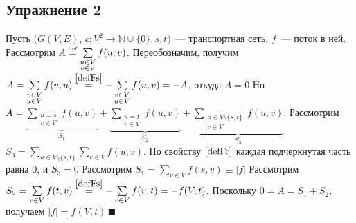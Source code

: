 \documentclass[a4paper]{article}
\def\eqdef{\overset{\mbox{\tiny def}}{=}}
\newcommand{\Nz}{\mathbb{N}\cup\{0\}}
\begin{document}
\subsection*{Упражнение 2}
\label{fst} Пусть $(G(V,E)$, $c\colon V^2\to\Nz, s, t)$~--- транспортная сеть. $f$~--- поток в ней.\newline
Рассмотрим $A\eqdef\sum\limits_{\substack{u\in V\\v\in V}} f(u,v)$. Переобозначим, получим $A=\sum\limits_{\substack{v\in V\\u\in V}}f(v,u)\overset{\ref{defFs}}{=}-\sum\limits_{\substack{v\in V\\u\in V}}f(u,v)=-A$, откуда $A=0$\newline
Но $A=\underbrace{\sum\limits_{\substack{u=s\\v\in V}}f(u,v)}_{S_1}+\underbrace{\sum\limits_{\substack{u=t\\v\in V}}f(u,v)}_{S_2}+\underbrace{\sum\limits_{\substack{u\in V\setminus \{s,t\}\\v\in V}}f(u,v)}_{S_3}$.\newline
Рассмотрим $S_3=\sum\limits_{u\in V\setminus\{s,t\}}\underline{\sum\limits_{v\in V}f(u,v)}$. По свойству $\ref{defFc}$ каждая подчеркнутая часть равна $0$, и $S_3=0$\newline
Рассмотрим $S_1=\sum\limits_{v\in V}f(s,v)\equiv |f|$\newline
Рассмотрим $S_2=\sum\limits_{v\in V}f(t,v)\overset{\ref{defFs}}{=} -\sum\limits_{v\in V}f(v,t)=-f(V,t)$.\newline
Поскольку $0=A=S_1+S_2$, получаем $|f|=f(V,t)\,\blacksquare$
\end{document}
